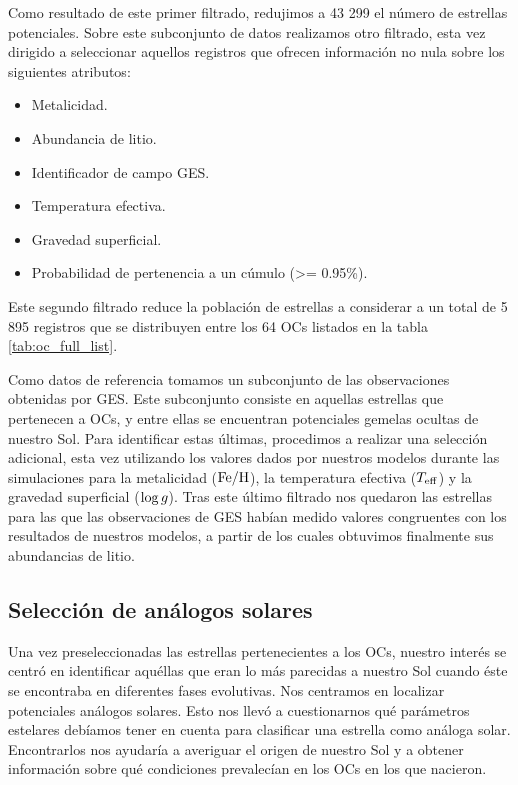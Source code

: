 Como resultado de este primer filtrado, redujimos a 43 299 el número de estrellas potenciales. Sobre este subconjunto de datos realizamos otro filtrado, esta vez dirigido a seleccionar aquellos registros que ofrecen información no nula sobre los siguientes atributos:

\begin{itemize}
	\item Metalicidad.
	\item Abundancia de litio.
	\item Identificador de campo GES.
	\item Temperatura efectiva.
	\item Gravedad superficial.
	\item Probabilidad de pertenencia a un cúmulo (>= 0.95\%).
\end{itemize}

Este segundo filtrado reduce la población de estrellas a considerar a un total de 5 895 registros que se distribuyen entre los 64 OCs listados en la tabla \ref{tab:oc_full_list}.\par

Como datos de referencia tomamos un subconjunto de las observaciones obtenidas por GES. Este subconjunto consiste en aquellas estrellas que pertenecen a OCs, y entre ellas se encuentran potenciales gemelas ocultas de nuestro Sol. Para identificar estas últimas, procedimos a realizar una selección adicional, esta vez utilizando los valores dados por nuestros modelos durante las simulaciones para la metalicidad ($\mathrm{Fe}/\mathrm{H}$), la temperatura efectiva ($T_{\mathrm{eff}}$) y la gravedad superficial ($\mathrm{log} \, g$). Tras este último filtrado nos quedaron las estrellas para las que las observaciones de GES habían medido valores congruentes con los resultados de nuestros modelos, a partir de los cuales obtuvimos finalmente sus abundancias de litio.\par

\subsection{Selección de análogos solares} \label{sec:gemelos_solares}
Una vez preseleccionadas las estrellas pertenecientes a los OCs, nuestro interés se centró en identificar aquéllas que eran lo más parecidas a nuestro Sol cuando éste se encontraba en diferentes fases evolutivas. Nos centramos en localizar potenciales análogos solares. Esto nos llevó a cuestionarnos qué parámetros estelares debíamos tener en cuenta para clasificar una estrella como análoga solar. Encontrarlos nos ayudaría a averiguar el origen de nuestro Sol y a obtener información sobre qué condiciones prevalecían en los OCs en los que nacieron.\par

